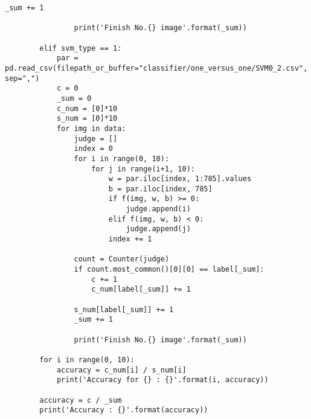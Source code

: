 \begin{lstlisting}[caption=課題2のMNISTの数字画像識別における識別器の多数決による識別用プログラム]
                _sum += 1

                print('Finish No.{} image'.format(_sum))

        elif svm_type == 1:
            par = pd.read_csv(filepath_or_buffer="classifier/one_versus_one/SVM0_2.csv", sep=",")
            c = 0
            _sum = 0
            c_num = [0]*10
            s_num = [0]*10
            for img in data:
                judge = []
                index = 0
                for i in range(0, 10):
                    for j in range(i+1, 10):
                        w = par.iloc[index, 1:785].values
                        b = par.iloc[index, 785]
                        if f(img, w, b) >= 0:
                            judge.append(i)
                        elif f(img, w, b) < 0:
                            judge.append(j)
                        index += 1

                count = Counter(judge)
                if count.most_common()[0][0] == label[_sum]:
                    c += 1
                    c_num[label[_sum]] += 1

                s_num[label[_sum]] += 1
                _sum += 1

                print('Finish No.{} image'.format(_sum))

        for i in range(0, 10):
            accuracy = c_num[i] / s_num[i]
            print('Accuracy for {} : {}'.format(i, accuracy))
            
        accuracy = c / _sum
        print('Accuracy : {}'.format(accuracy))
\end{lstlisting}